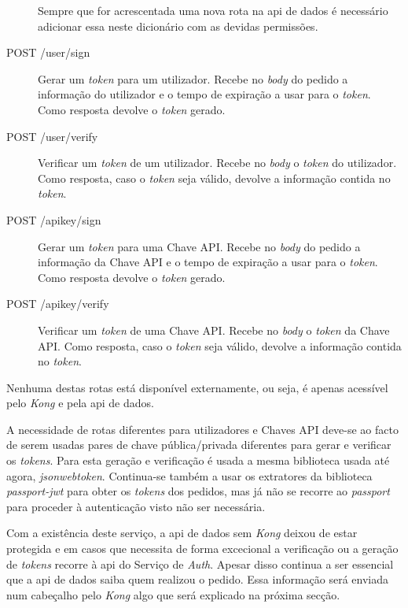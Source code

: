 \begin{description}
        Sempre que for acrescentada uma nova rota na \acrshort{api} de dados é necessário adicionar essa neste dicionário com as devidas permissões.
    \item[POST /user/sign] Gerar um \textit{token} para um utilizador. Recebe no \textit{body} do pedido a informação do utilizador e o tempo de expiração a usar para o \textit{token}. Como resposta devolve o \textit{token} gerado.
    \item[POST /user/verify] Verificar um \textit{token} de um utilizador. Recebe no \textit{body} o \textit{token} do utilizador. Como resposta, caso o \textit{token} seja válido, devolve a informação contida no \textit{token}.
    \item[POST /apikey/sign] Gerar um \textit{token} para uma Chave API. Recebe no \textit{body} do pedido a informação da Chave API e o tempo de expiração a usar para o \textit{token}. Como resposta devolve o \textit{token} gerado.
    \item[POST /apikey/verify] Verificar um \textit{token} de uma Chave API. Recebe no \textit{body} o \textit{token} da Chave API. Como resposta, caso o \textit{token} seja válido, devolve a informação contida no \textit{token}.
\end{description}

Nenhuma destas rotas está disponível externamente, ou seja, é apenas acessível pelo \textit{Kong} e pela \acrshort{api} de dados.

A necessidade de rotas diferentes para utilizadores e Chaves API deve-se ao facto de serem usadas pares de chave pública/privada diferentes para gerar e verificar os \textit{tokens}. Para esta geração e verificação é usada a mesma biblioteca usada até agora, \textit{jsonwebtoken}. Continua-se também a usar os extratores da biblioteca \textit{passport-jwt} para obter os \textit{tokens} dos pedidos, mas já não se recorre ao \textit{passport} para proceder à autenticação visto não ser necessária.

Com a existência deste serviço, a \acrshort{api} de dados sem \textit{Kong} deixou de estar protegida e em casos que necessita de forma excecional a verificação ou a geração de \textit{tokens} recorre à \acrshort{api} do Serviço de \textit{Auth}. Apesar disso continua a ser essencial que a \acrshort{api} de dados saiba quem realizou o pedido. Essa informação será enviada num cabeçalho pelo \textit{Kong} algo que será explicado na próxima secção.


